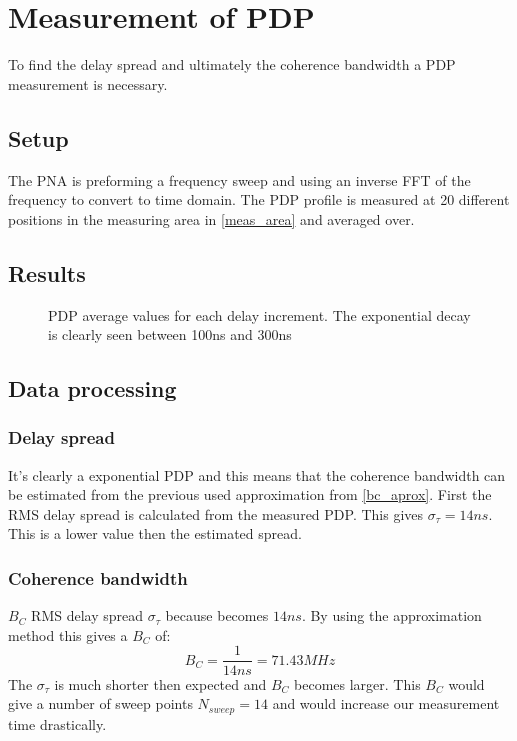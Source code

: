 \chapter{Measurement of PDP}
To find the delay spread and ultimately the coherence bandwidth a \gls{PDP} measurement is necessary. 
\section{Setup}
The PNA is preforming a frequency sweep and using an inverse FFT of the frequency to convert to time domain.
The PDP profile is measured at 20 different positions in the measuring area in \autoref{meas_area} and averaged over. 
\section{Results}

\begin{figure}[H]
\centering

\caption{PDP average values for each delay increment. The exponential decay is clearly seen between 100ns and 300ns}

\label{fig:SNRMeas}
\end{figure}
\section{Data processing}

\subsection{Delay spread}
It's clearly a exponential PDP and this means that the coherence bandwidth can be estimated from the previous used approximation from \autoref{bc_aprox}. First the RMS delay spread is calculated from the measured PDP. This gives $\sigma_{\tau} = 14ns$. This is a lower value then the estimated spread.
\subsection{Coherence bandwidth}\label{sec:coherence_bandwidth}
$B_C$ RMS delay spread $\sigma_{\tau}$ because becomes $14ns$. By using the approximation method this gives a $B_C$ of:
\begin{equation}
B_C = \frac{1}{14ns} = 71.43 MHz 
\end{equation}
The $\sigma_{\tau}$ is much shorter then expected and $B_C$ becomes larger. This $B_C$ would give a number of sweep points $N_{sweep} = 14$ and would increase our measurement time drastically.


